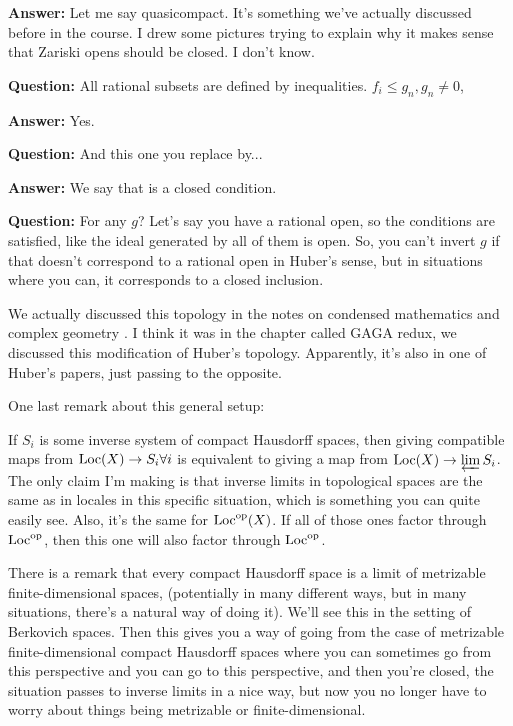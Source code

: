 \begin{example}
\textbf{Answer:} Let me say quasicompact. It's something we've actually discussed before in the course. I drew some pictures trying to explain why it makes sense that Zariski opens should be closed. I don't know.

\textbf{Question:} All rational subsets are defined by inequalities. $f_i \leq g_n, g_n \neq 0$, 

\textbf{Answer:} Yes.

\textbf{Question:} And this one you replace by...

\textbf{Answer:} We say that is a closed condition. 

\textbf{Question:} For any $g$? Let's say you have a rational open, so the conditions are satisfied, like the ideal generated by all of them  is open. So, you can't invert $g$ if that doesn't correspond to a rational open in Huber's sense, but in situations where you can, it corresponds to a closed inclusion.

We actually discussed this topology in the notes on condensed mathematics and complex geometry . I think it was in the chapter called GAGA redux, we discussed this modification of Huber's topology. Apparently, it's also in one of Huber's papers, just passing to the opposite.

\begin{remark}
One last remark about this general setup: 

If $S_i$ is some inverse system of compact Hausdorff spaces, then giving compatible maps from $\operatorname{Loc}(X) \to S_i \forall i$ is equivalent to giving a map from $\operatorname{Loc}(X) \to \varprojlim S_i$. 
The only claim I'm making is that inverse limits in topological spaces are the same as in locales in this specific situation, which is something you can quite easily see. 
Also, it's the same for $\operatorname{Loc}^{\mathrm{op}}(X)$.  If all of those ones factor through $\operatorname{Loc}^{\mathrm{op}}$, then this one will also factor through $\operatorname{Loc}^{\mathrm{op}}$.

There is a remark that every compact Hausdorff space is a limit of metrizable finite-dimensional spaces, (potentially in many different ways, but in many situations, there's a natural way of doing it). We'll see this in the setting of Berkovich spaces. Then this gives you a way of going from the case of metrizable finite-dimensional compact Hausdorff spaces where you can sometimes go from this perspective  and you can go to this perspective, and then you're closed, the situation passes to inverse limits in a nice way, but now you no longer have to worry about things being metrizable or finite-dimensional.
\end{remark}


\end{example}
